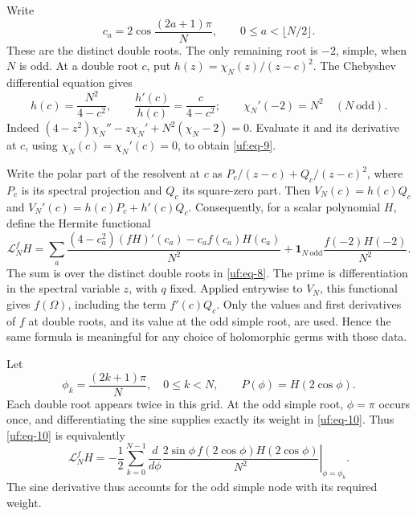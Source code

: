 Write \begin{equation}\label{uf:eq-8}
c_a=2\cos\frac{(2a+1)\pi}{N},\qquad
 0\le a<\lfloor N/2\rfloor.
\end{equation} These are the distinct double roots. The only remaining root is
\(-2\), simple, when \(N\) is odd. At a double root \(c\), put
\(h(z)=\chi_N(z)/(z-c)^2\). The Chebyshev differential equation gives \begin{equation}\label{uf:eq-9}
h(c)=\frac{N^2}{4-c^2},\qquad
 \frac{h'(c)}{h(c)}=\frac{c}{4-c^2};
 \qquad \chi_N'(-2)=N^2\quad(N\ \mathrm{odd}).
\end{equation} Indeed \((4-z^2)\chi_N''-z\chi_N'+N^2(\chi_N-2)=0\). Evaluate it and
its derivative at \(c\), using \(\chi_N(c)=\chi_N'(c)=0\), to obtain
\eqref{uf:eq-9}.

Write the polar part of the resolvent at $c$ as
$P_c/(z-c)+Q_c/(z-c)^2$, where $P_c$ is its spectral projection and
$Q_c$ its square-zero part. Then
\(V_N(c)=h(c)Q_c\) and \(V_N'(c)=h(c)P_c+h'(c)Q_c\). Consequently, for a scalar polynomial $H$, define the Hermite
functional
\begin{equation}\label{uf:eq-10}
\mathcal L_N^fH=
 \sum_a\frac{(4-c_a^2)(fH)'(c_a)-c_af(c_a)H(c_a)}{N^2}
 +\mathbf1_{N\ \mathrm{odd}}\frac{f(-2)H(-2)}{N^2}.
\end{equation} The sum is over the distinct double roots in \eqref{uf:eq-8}.
The prime is differentiation in the spectral variable $z$, with $q$
fixed. Applied entrywise to $V_N$, this functional gives $f(\Omega)$,
including the term $f'(c)Q_c$. Only the values and first derivatives
of $f$ at double roots, and its value at the odd simple root, are
used. Hence the same formula is meaningful for any choice of
holomorphic germs with those data.

Let \begin{equation}\label{uf:eq-11}
\phi_k=\frac{(2k+1)\pi}{N},\quad 0\le k<N,\qquad
 P(\phi)=H(2\cos\phi).
\end{equation} Each double root appears twice in this grid. At the odd simple root,
\(\phi=\pi\) occurs once, and differentiating the sine supplies exactly
its weight in \eqref{uf:eq-10}. Thus \eqref{uf:eq-10} is equivalently \begin{equation}\label{uf:eq-12}
\mathcal L_N^fH
 =-\frac1{2}\sum_{k=0}^{N-1}
       \left.\frac{d}{d\phi}
       \frac{2\sin\phi\,f(2\cos\phi)H(2\cos\phi)}{N^2}
       \right|_{\phi=\phi_k}.
\end{equation} The sine derivative thus accounts for the odd simple node with its required weight.

